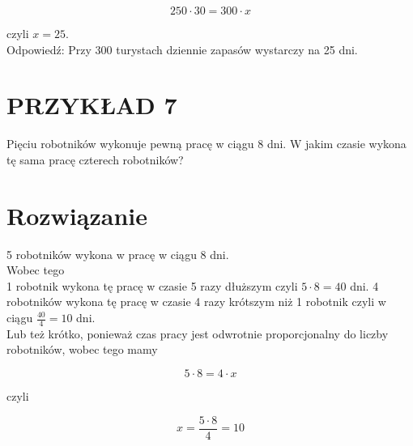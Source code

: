 \documentclass[10pt]{article}
\begin{document}
\[
250 \cdot 30=300 \cdot x
\]

czyli \(x=25\).\\
Odpowiedź: Przy 300 turystach dziennie zapasów wystarczy na 25 dni.

\section*{PRZYKŁAD 7}
Pięciu robotników wykonuje pewną pracę w ciągu 8 dni. W jakim czasie wykona tę sama pracę czterech robotników?

\section*{Rozwiązanie}
5 robotników wykona w pracę w ciągu 8 dni.\\
Wobec tego\\
1 robotnik wykona tę pracę w czasie 5 razy dłuższym czyli \(5 \cdot 8=40\) dni. 4 robotników wykona tę pracę w czasie 4 razy krótszym niż 1 robotnik czyli w ciągu \(\frac{40}{4}=10\) dni.\\
Lub też krótko, ponieważ czas pracy jest odwrotnie proporcjonalny do liczby robotników, wobec tego mamy

\[
5 \cdot 8=4 \cdot x
\]

czyli

\[
x=\frac{5 \cdot 8}{4}=10
\]
\end{document}
